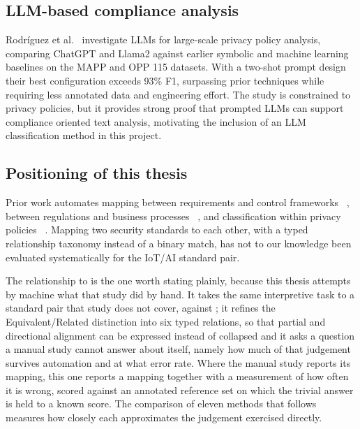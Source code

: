 \subsection{LLM-based compliance analysis}

Rodríguez et al.~\cite{rodriguez2024llm} investigate LLMs for large-scale
privacy policy analysis, comparing ChatGPT and Llama2 against earlier
symbolic and machine learning baselines on the MAPP and OPP 115 datasets.
With a two-shot prompt design their best configuration exceeds 93\% F1,
surpassing prior techniques while requiring less annotated data and
engineering effort. The study is constrained to privacy policies, but it provides
strong proof that prompted LLMs can support compliance oriented text
analysis, motivating the inclusion of an LLM classification method in this
project.

\subsection{Positioning of this thesis}

Prior work automates mapping between requirements and control frameworks
~\cite{barhaim2023cloud}, between regulations and business processes
~\cite{sapkota2016regcmantic}, and classification within privacy policies
~\cite{rodriguez2024llm}. Mapping two security standards to each other, with
a typed relationship taxonomy instead of a binary match, has not to our
knowledge been evaluated systematically for the IoT/AI standard pair.

The relationship to \cite{djebbar2023comparative} is the one worth stating
plainly, because this thesis attempts by machine what that study did by hand.
It takes the same interpretive task to a standard pair that study does not
cover, \standardA{} against \standardB{}; it refines the Equivalent/Related
distinction into six typed relations, so that partial and directional
alignment can be expressed instead of collapsed and it asks a question a manual
study cannot answer about itself, namely how much of that judgement survives
automation and at what error rate. Where the manual study reports its mapping,
this one reports a mapping together with a measurement of how often it is wrong,
scored against an annotated reference set on which the trivial answer is held to
a known score. The comparison of eleven methods that follows measures how closely
each approximates the judgement \cite{djebbar2023comparative} exercised
directly.

